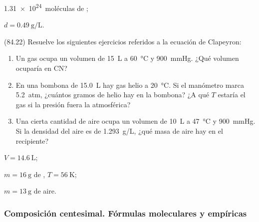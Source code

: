 \documentclass[10pt,a5paper,twoside]{article}
\begin{document}
      \begin{solution}
        \begin{enumerate*}
          \item \SI{1.31e24}{moléculas} de ; \item \( d = \SI{0.49}{\gram\per\liter} \).
        \end{enumerate*}
      \end{solution}




      \begin{exercise}[
          tags    = {},
          topics  = {química,química básica},
          source  = {FQ 1B MGH 2016, p84, e22},
        ]
        (84.22) Resuelve los siguientes ejercicios referidos a la ecuación de Clapeyron:
        \begin{enumerate}
          \item Un gas ocupa un volumen de \SI{15}{\liter} a \SI{60}{\celsius} y \SI{900}{\mmHg}. ¿Qué volumen ocuparía en CN?
          \item En una bombona de \SI{15.0}{\liter} hay gas helio a \SI{20}{\celsius}. Si el manómetro marca \SI{5.2}{atm}, ¿cuántos gramos de helio hay en la bombona? ¿A qué \( T \) estaría el gas si la presión fuera la atmosférica?
          \item Una cierta cantidad de aire ocupa un volumen de \SI{10}{\liter} a \SI{47}{\celsius} y \SI{900}{\mmHg}. Si la densidad del aire es de \SI{1.293}{g/L}, ¿qué masa de aire hay en el recipiente?
        \end{enumerate}
      \end{exercise}

      \begin{solution}
        \begin{enumerate*}
          \item \( V = \SI{14.6}{\liter} \);
          \item \( m = \SI{16}{\gram} \) de , \( T = \SI{56}{\kelvin} \); \item \( m = \SI{13}{\gram} \) de aire.
        \end{enumerate*}
      \end{solution}






  \subsubsection*{Composición centesimal. Fórmulas moleculares y empíricas}
\end{document}
